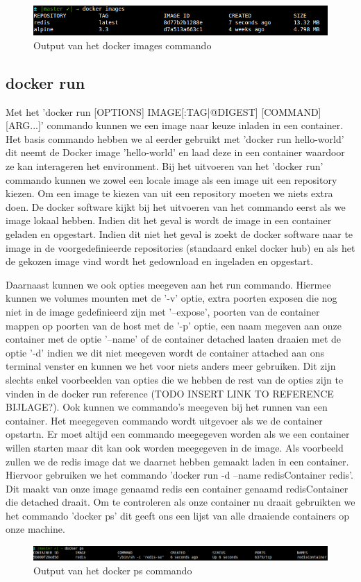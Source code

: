 \begin{figure}[!ht]
	\centering
	\includegraphics[scale=0.55]{img/dockerImages.png}
	\caption{Output van het docker images commando}
\end{figure}



\subsection{docker run}

Met het 'docker run [OPTIONS] IMAGE[:TAG|@DIGEST] [COMMAND] [ARG...]' commando kunnen we een image naar keuze inladen in een container. Het basis commando hebben we al eerder gebruikt met 'docker run hello-world' dit neemt de Docker image 'hello-world' en laad deze in een container waardoor ze kan interageren het environment. Bij het uitvoeren van het 'docker run' commando kunnen we zowel een locale image als een image uit een repository kiezen. Om een image te kiezen van uit een repository moeten we niets extra doen. De docker software kijkt bij het uitvoeren van het commando eerst als we image lokaal hebben. Indien dit het geval is wordt de image in een container geladen en opgestart. Indien dit niet het geval is zoekt de docker software naar te image in de voorgedefinieerde repositories (standaard enkel docker hub) en als het de gekozen image vind wordt het gedownload en ingeladen en opgestart.

Daarnaast kunnen we ook opties meegeven aan het run commando. Hiermee kunnen we volumes mounten met de '-v' optie, extra poorten exposen die nog niet in de image gedefinieerd zijn met '--expose', poorten van de container mappen op poorten van de host met de '-p' optie, een naam megeven aan onze container met de optie '--name'  of de container detached laaten draaien met de optie '-d' indien we dit niet meegeven wordt de container attached aan ons terminal venster en kunnen we het voor niets anders meer gebruiken. Dit zijn slechts enkel voorbeelden van opties die we hebben de rest van de opties zijn te vinden in de docker run reference (TODO INSERT LINK TO REFERENCE BIJLAGE?). Ook kunnen we commando's meegeven bij het runnen van een container. Het meegegeven commando wordt uitgevoer als we de container opstartn. Er moet altijd een commando meegegeven worden als we een container willen starten maar dit kan ook worden meegegeven in de image. Als voorbeeld zullen we de redis image dat we daarnet hebben gemaakt laden in een container. Hiervoor gebruiken we het commando 'docker run -d --name redisContainer redis'. Dit maakt van onze image genaamd redis een container genaamd redisContainer die detached draait. Om te controleren als onze container nu draait gebruikten we het commando 'docker ps' dit geeft ons een lijst van alle draaiende containers op onze machine. 
 
 
\begin{figure}[!ht]
 	\centering
 	\includegraphics[scale=0.35]{img/dockerps.png}
 	\caption{Output van het docker ps commando}
\end{figure}